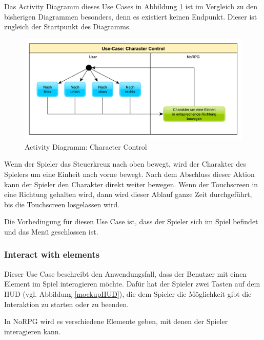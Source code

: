 			Das Activity Diagramm dieses Use Cases in Abbildung \ref{umlControl} ist im Vergleich zu den bisherigen Diagrammen besonders, denn es existiert keinen Endpunkt. Dieser ist zugleich der Startpunkt des Diagramms.
			
			\begin{figure}[htbp]
				\centering 
				\label{umlControl}
				\includegraphics[width=13cm]{pics/CharacterControl.pdf}
				\caption{Activity Diagramm: Character Control}
			\end{figure}
		
			Wenn der Spieler das Steuerkreuz nach oben bewegt, wird der Charakter des Spielers um eine Einheit nach vorne bewegt. Nach dem Abschluss dieser Aktion kann der Spieler den Charakter direkt weiter bewegen. Wenn der Touchscreen in eine Richtung gehalten wird, dann wird dieser Ablauf ganze Zeit durchgeführt, bis die Touchscreen losgelassen wird.
			
			Die Vorbedingung für diesen Use Case ist, dass der Spieler sich im Spiel befindet und das Menü geschlossen ist.
	
		\subsubsection{Interact with elements}
			Dieser Use Case beschreibt den Anwendungsfall, dass der Benutzer mit einen Element im Spiel interagieren möchte. Dafür hat der Spieler zwei Tasten auf dem \ac{HUD} (vgl. Abbildung \ref{mockupHUD}), die dem Spieler die Möglichkeit gibt die Interaktion zu starten oder zu beenden.
			
			In NoRPG wird es verschiedene Elemente geben, mit denen der Spieler interagieren kann.
			
